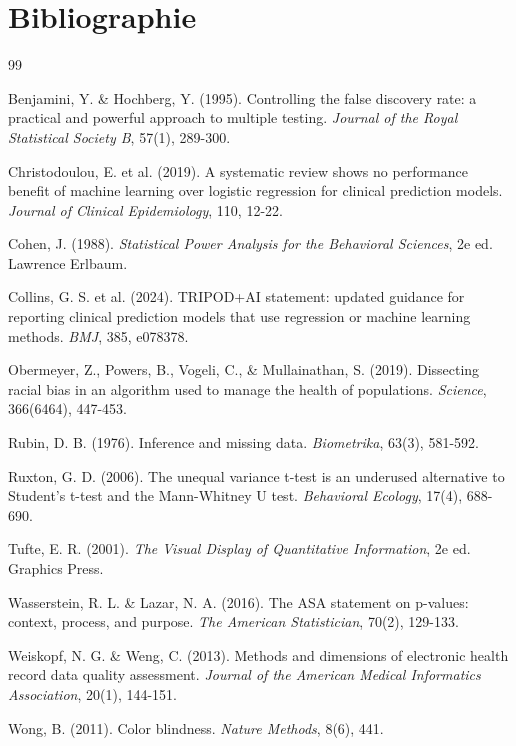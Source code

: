 \documentclass[11pt,a4paper]{article}
\begin{document}

\section*{Bibliographie}

\renewcommand{\refname}{}

\begin{thebibliography}{99}

Benjamini, Y. \& Hochberg, Y. (1995).
Controlling the false discovery rate: a practical and powerful approach
to multiple testing.
\emph{Journal of the Royal Statistical Society B}, 57(1), 289-300.

Christodoulou, E. et al. (2019).
A systematic review shows no performance benefit of machine learning
over logistic regression for clinical prediction models.
\emph{Journal of Clinical Epidemiology}, 110, 12-22.

Cohen, J. (1988).
\emph{Statistical Power Analysis for the Behavioral Sciences}, 2e ed.
Lawrence Erlbaum.

Collins, G. S. et al. (2024).
TRIPOD+AI statement: updated guidance for reporting clinical prediction
models that use regression or machine learning methods.
\emph{BMJ}, 385, e078378.

Obermeyer, Z., Powers, B., Vogeli, C., \& Mullainathan, S. (2019).
Dissecting racial bias in an algorithm used to manage the health of
populations.
\emph{Science}, 366(6464), 447-453.

Rubin, D. B. (1976).
Inference and missing data.
\emph{Biometrika}, 63(3), 581-592.

Ruxton, G. D. (2006).
The unequal variance t-test is an underused alternative to Student's
t-test and the Mann-Whitney U test.
\emph{Behavioral Ecology}, 17(4), 688-690.

Tufte, E. R. (2001).
\emph{The Visual Display of Quantitative Information}, 2e ed.
Graphics Press.

Wasserstein, R. L. \& Lazar, N. A. (2016).
The ASA statement on p-values: context, process, and purpose.
\emph{The American Statistician}, 70(2), 129-133.

Weiskopf, N. G. \& Weng, C. (2013).
Methods and dimensions of electronic health record data quality
assessment.
\emph{Journal of the American Medical Informatics Association}, 20(1),
144-151.

Wong, B. (2011).
Color blindness.
\emph{Nature Methods}, 8(6), 441.

\end{thebibliography}
\end{document}

